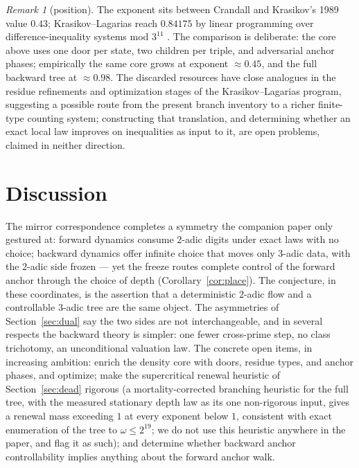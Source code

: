\documentclass[11pt]{article}
\theoremstyle{remark}
\newtheorem{remark}[theorem]{Remark}
\newcommand{\w}{\omega}
\begin{document}
\begin{remark}[position]
The exponent sits between Crandall \cite{crandall} and Krasikov's 1989 value $0.43$; Krasikov--Lagarias reach $0.84175$ by linear programming over difference-inequality systems mod $3^{11}$ \cite{kl}. The comparison is deliberate: the core above uses one door per state, two children per triple, and adversarial anchor phases; empirically the same core grows at exponent $\approx 0.45$, and the full backward tree at $\approx 0.98$. The discarded resources have close analogues in the residue refinements and optimization stages of the Krasikov--Lagarias program, suggesting a possible route from the present branch inventory to a richer finite-type counting system; constructing that translation, and determining whether an exact local law improves on inequalities as input to it, are open problems, claimed in neither direction.
\end{remark}

\section{Discussion}

The mirror correspondence completes a symmetry the companion paper only gestured at: forward dynamics consume $2$-adic digits under exact laws with no choice; backward dynamics offer infinite choice that moves only $3$-adic data, with the $2$-adic side frozen --- yet the freeze routes complete control of the forward anchor through the choice of depth (Corollary~\ref{cor:place}). The conjecture, in these coordinates, is the assertion that a deterministic $2$-adic flow and a controllable $3$-adic tree are the same object. The asymmetries of Section~\ref{sec:dual} say the two sides are not interchangeable, and in several respects the backward theory is simpler: one fewer cross-prime step, no class trichotomy, an unconditional valuation law. The concrete open items, in increasing ambition: enrich the density core with doors, residue types, and anchor phases, and optimize; make the supercritical renewal heuristic of Section~\ref{sec:dead} rigorous (a mortality-corrected branching heuristic for the full tree, with the measured stationary depth law as its one non-rigorous input, gives a renewal mass exceeding $1$ at every exponent below $1$, consistent with exact enumeration of the tree to $\w \le 2^{19}$; we do not use this heuristic anywhere in the paper, and flag it as such); and determine whether backward anchor controllability implies anything about the forward anchor walk.
\end{document}
